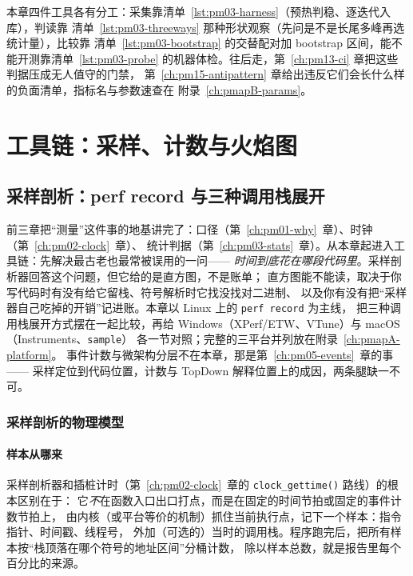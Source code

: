 \documentclass[12pt,a4paper,fontset=fandol]{ctexbook}
\newcommand{\Fn}[1]{\texttt{#1()}}
\newcommand{\Tp}[1]{\texttt{#1}}
\newcommand{\Bk}{\discretionary{}{}{}}
\begin{document}
本章四件工具各有分工：采集靠清单~\ref{lst:pm03-harness}（预热判稳、逐迭代入库），判读靠
清单~\ref{lst:pm03-threeways} 那种形状观察（先问是不是长尾多峰再选统计量），比较靠
清单~\ref{lst:pm03-bootstrap} 的交替配对加 bootstrap 区间，能不能开测靠清单~\ref{lst:pm03-probe}
的机器体检。往后走，第~\ref{ch:pm13-ci} 章把这些判据压成无人值守的门禁，
第~\ref{ch:pm15-antipattern} 章给出违反它们会长什么样的负面清单，指标名与参数速查在
附录~\ref{ch:pmapB-params}。

\part{工具链：采样、计数与火焰图}

\chapter{采样剖析：perf record 与三种调用栈展开}
\label{ch:pm04-sampling}

前三章把``测量''这件事的地基讲完了：口径（第~\ref{ch:pm01-why}~章）、时钟（第~\ref{ch:pm02-clock}~章）、
统计判据（第~\ref{ch:pm03-stats}~章）。从本章起进入工具链：先解决最古老也最常被误用的一问——
\emph{时间到底花在哪段代码里}。采样剖析器回答这个问题，但它给的是直方图，不是账单；
直方图能不能读，取决于你写代码时有没有给它留栈、符号解析时它找没找对二进制、
以及你有没有把``采样器自己吃掉的开销''记进账。本章以 Linux 上的 \Tp{perf record} 为主线，
把三种调用栈展开方式摆在一起比较，再给 Windows（XPerf/ETW、VTune）与 macOS（Instruments、\Tp{sample}）
各一节对照；完整的三平台并列放在附录~\ref{ch:pmapA-platform}。
事件计数与微架构分层不在本章，那是第~\ref{ch:pm05-events}~章的事——
采样定位到代码位置，计数与 TopDown 解释位置上的成因，两条腿缺一不可。

\section{采样剖析的物理模型}
\label{sec:pm04-model}

\subsection{样本从哪来}

采样剖析器和插桩计时（第~\ref{ch:pm02-clock}~章的 \Fn{clock{\Bk}\_gettime} 路线）的根本区别在于：
它\emph{不}在函数入口出口打点，而是在固定的时间节拍或固定的事件计数节拍上，
由内核（或平台等价的机制）抓住当前执行点，记下一个样本：指令指针、时间戳、线程号，
外加（可选的）当时的调用栈。程序跑完后，把所有样本按``栈顶落在哪个符号的地址区间''分桶计数，
除以样本总数，就是报告里每个百分比的来源。
\end{document}
